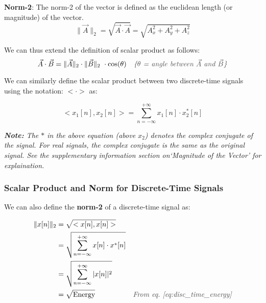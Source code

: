 \documentclass[letterpaper,12pt]{article}
\newcommand{\annot}[1]{\textcolor{darkgray}{\textit{#1}}}
\begin{document}
\textbf{Norm-2}: The norm-2 of the vector is defined as the euclidean length (or magnitude) of the vector.
\[\| \Vec{A} \|_2 = \sqrt{\Vec{A} \cdot \Vec{A}} = \sqrt{A_{x}^2 + A_{y}^2 + A_{z}^2}\]

We can thus extend the definition of scalar product as follows:
\[\Vec{A}\cdot\Vec{B} = \| \Vec{A} \|_2 \cdot \| \Vec{B} \|_2\ \cdot \cos(\theta) \quad \text{\annot{\{$\theta$ = angle between $\Vec{A}$ and $\Vec{B}$\}}}\]

We can similarly define the scalar product between two discrete-time signals using the notation: $<\cdot>$ as:

\begin{equation}
    \label{eq:scalar_product_discrete_time}
    <x_{1}[n], x_{2}[n]> = \sum_{n=-\infty}^{+\infty} x_{1}[n] \cdot x_{2}^{*}[n]
\end{equation}

\textit{\textbf{Note:} The $*$ in the above equation (above $x_{2}$) denotes the complex conjugate of the signal. For real signals, the complex conjugate is the same as the original signal. See the supplementary information section on`Magnitude of the Vector' for explaination.}

\vspace{0.5cm}

\subsubsection*{Scalar Product and Norm for Discrete-Time Signals}

We can also define the \textbf{norm-2} of a discrete-time signal as:

\begin{equation}
    \begin{aligned}
        \| x[n] \|_2 & = \sqrt{<x[n], x[n]>}                                                                                       \\
                     & = \sqrt{\sum_{n=-\infty}^{+\infty} x[n] \cdot x^{*}[n]}                                                     \\
                     & = \sqrt{\sum_{n=-\infty}^{+\infty}|x[n]|^{2}}                                                               \\
                     & = \sqrt{\text{Energy}}                                  & \annot{\text{From eq.~\ref{eq:disc_time_energy}}}
    \end{aligned}
    \label{eq:norm_discrete_time}
\end{equation}
\end{document}
